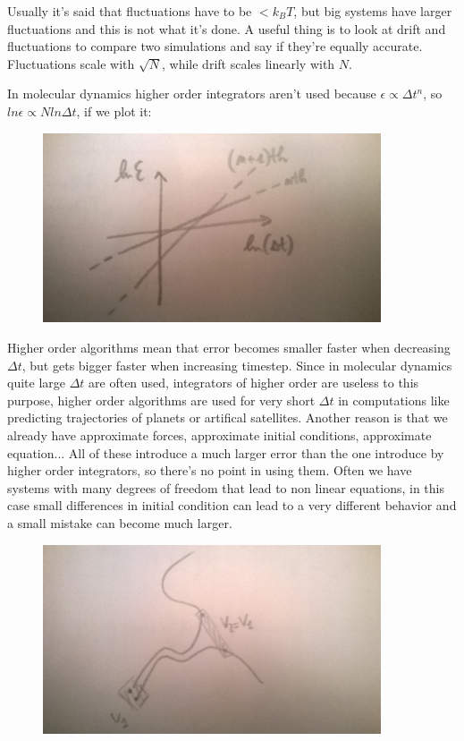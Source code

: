 \documentclass[a4paper, italian, openany]{book}
\begin{document}
Usually it's said that fluctuations have to be $< k_B T$, but big systems have larger fluctuations and this is not what it's done.\newline
A useful thing is to look at drift and fluctuations to compare two simulations and say if they're equally accurate.\newline
Fluctuations scale with $\sqrt{N}$, while drift scales linearly with $N$.\newline

In molecular dynamics higher order integrators aren't used because $\epsilon \propto \Delta t^n$, so $ln \epsilon \propto N ln \Delta t$, if we plot it:

\begin{figure}[H]
\centering
\includegraphics[width=100mm]{img/pic8.jpg}
\end{figure}

Higher order algorithms mean that error becomes smaller faster when decreasing $\Delta t $, but gets bigger faster when increasing timestep. Since in molecular dynamics quite large $\Delta t$ are often used, integrators of higher order are useless to this purpose, higher order algorithms are used for very short $\Delta t$ in computations like predicting trajectories of planets or artifical satellites.\newline
Another reason is that we already have approximate forces, approximate initial conditions, approximate equation... All of these introduce a much larger error than the one introduce by higher order integrators, so there's no point in using them.\newline
Often we have systems with many degrees of freedom that lead to non linear equations, in this case small differences in initial condition can lead to a very different behavior and a small mistake can become much larger.

\begin{figure}[H]
\centering
\includegraphics[width=100mm]{img/pic9.jpg}
\end{figure}
\end{document}
